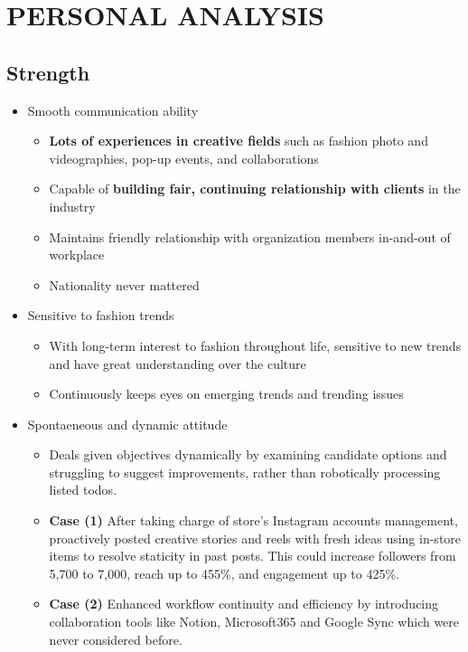 \documentclass[a4paper,10pt]{extarticle}
\begin{document}
\section*{PERSONAL ANALYSIS}
\subsection*{Strength}
\begin{itemize}
	\item Smooth communication ability
	      \begin{itemize}
		      \item \textbf{Lots of experiences in creative fields} such as fashion photo and videographies, pop-up events, and collaborations
		      \item Capable of \textbf{building fair, continuing relationship with clients} in the industry
		      \item Maintains friendly relationship with organization members in-and-out of workplace
		      \item Nationality never mattered
	      \end{itemize}
	\item Sensitive to fashion trends
	      \begin{itemize}
		      \item With long-term interest to fashion throughout life, sensitive to new trends and have great understanding over the culture
		      \item Continuously keeps eyes on emerging trends and trending issues
	      \end{itemize}
	\item Spontaeneous and dynamic attitude
	      \begin{itemize}
		      \item Deals given objectives dynamically by examining candidate options and struggling to suggest improvements, rather than robotically processing listed todos.
		      \item \textbf{Case (1)} After taking charge of store's Instagram accounts management, proactively posted creative stories and reels with fresh ideas using in-store items to resolve staticity in past posts. This could increase followers from 5,700 to 7,000, reach up to 455\%, and engagement up to 425\%.
		      \item \textbf{Case (2)} Enhanced workflow continuity and efficiency by introducing collaboration tools like Notion, Microsoft365 and Google Sync which were never considered before.
	      \end{itemize}

\end{itemize}
\end{document}
